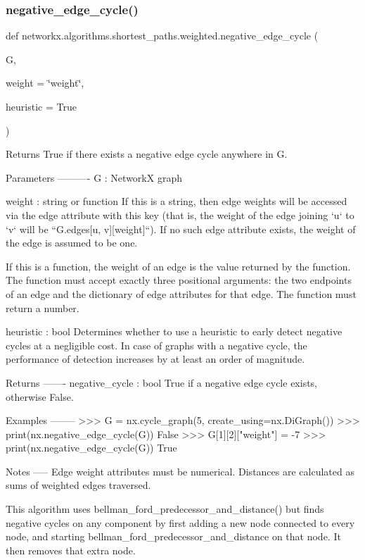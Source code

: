 \subsubsection{\texorpdfstring{negative\+\_\+edge\+\_\+cycle()}{negative\_edge\_cycle()}}
{\footnotesize\ttfamily def networkx.\+algorithms.\+shortest\+\_\+paths.\+weighted.\+negative\+\_\+edge\+\_\+cycle (\begin{DoxyParamCaption}\item[{}]{G,  }\item[{}]{weight = {\ttfamily \char`\"{}weight\char`\"{}},  }\item[{}]{heuristic = {\ttfamily True} }\end{DoxyParamCaption})}

\begin{DoxyVerb}Returns True if there exists a negative edge cycle anywhere in G.

Parameters
----------
G : NetworkX graph

weight : string or function
    If this is a string, then edge weights will be accessed via the
    edge attribute with this key (that is, the weight of the edge
    joining `u` to `v` will be ``G.edges[u, v][weight]``). If no
    such edge attribute exists, the weight of the edge is assumed to
    be one.

    If this is a function, the weight of an edge is the value
    returned by the function. The function must accept exactly three
    positional arguments: the two endpoints of an edge and the
    dictionary of edge attributes for that edge. The function must
    return a number.

heuristic : bool
    Determines whether to use a heuristic to early detect negative
    cycles at a negligible cost. In case of graphs with a negative cycle,
    the performance of detection increases by at least an order of magnitude.

Returns
-------
negative_cycle : bool
    True if a negative edge cycle exists, otherwise False.

Examples
--------
>>> G = nx.cycle_graph(5, create_using=nx.DiGraph())
>>> print(nx.negative_edge_cycle(G))
False
>>> G[1][2]["weight"] = -7
>>> print(nx.negative_edge_cycle(G))
True

Notes
-----
Edge weight attributes must be numerical.
Distances are calculated as sums of weighted edges traversed.

This algorithm uses bellman_ford_predecessor_and_distance() but finds
negative cycles on any component by first adding a new node connected to
every node, and starting bellman_ford_predecessor_and_distance on that
node.  It then removes that extra node.
\end{DoxyVerb}
